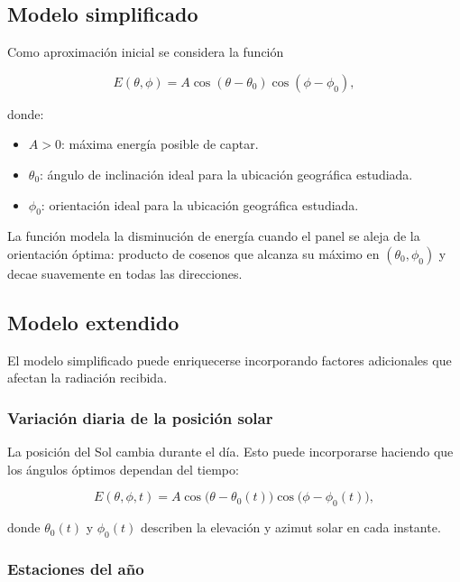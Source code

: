 \documentclass[12pt,a4paper]{article}
\begin{document}
\subsection{Modelo simplificado}

Como aproximación inicial se considera la función

\begin{equation}\label{eq:base}
E(\theta,\phi)=A\cos(\theta-\theta_0)\cos(\phi-\phi_0),
\end{equation}

donde:
\begin{itemize}
    \item $A>0$: máxima energía posible de captar.
    \item $\theta_0$: ángulo de inclinación ideal para la ubicación geográfica estudiada.
    \item $\phi_0$: orientación ideal para la ubicación geográfica estudiada.
\end{itemize}

La función modela la disminución de energía cuando el panel se aleja de la orientación óptima: producto de cosenos que alcanza su máximo en $(\theta_0,\phi_0)$ y decae suavemente en todas las direcciones.

\subsection{Modelo extendido}

El modelo simplificado puede enriquecerse incorporando factores adicionales que afectan la radiación recibida.

\subsubsection{Variación diaria de la posición solar}

La posición del Sol cambia durante el día. Esto puede incorporarse haciendo que los ángulos óptimos dependan del tiempo:

\begin{equation}\label{eq:ext_tiempo}
E(\theta,\phi,t)=A\cos\!\big(\theta-\theta_0(t)\big)\cos\!\big(\phi-\phi_0(t)\big),
\end{equation}

donde $\theta_0(t)$ y $\phi_0(t)$ describen la elevación y azimut solar en cada instante.

\subsubsection{Estaciones del año}
\end{document}
